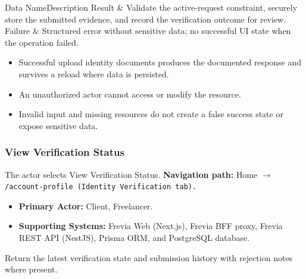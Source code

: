 \begin{specdatatable}{Data Name}{Description}
Result & Validate the active-request constraint, securely store the submitted evidence, and record the verification outcome for review.\\ \hline
Failure & Structured error without sensitive data; no successful UI state when the operation failed.\\ \hline
\end{specdatatable}

\begin{itemize}[leftmargin=1.6em,topsep=3pt,itemsep=2pt,parsep=0pt,label=$\bullet$]
    \item Successful upload identity documents produces the documented response and survives a reload where data is persisted.
    \item An unauthorized actor cannot access or modify the resource.
    \item Invalid input and missing resources do not create a false success state or expose sensitive data.
\end{itemize}

\subsubsection{View Verification Status}

The actor selects View Verification Status.\newline
\textbf{Navigation path:} Home $\rightarrow$ \texttt{/\allowbreak{}account-\allowbreak{}profile (Identity Verification tab).}


\begin{itemize}[leftmargin=1.6em,topsep=3pt,itemsep=2pt,parsep=0pt,label=$\bullet$]
    \item \textbf{Primary Actor:} Client, Freelancer.
    \item \textbf{Supporting Systems:} Frevia Web (Next.js), Frevia BFF proxy, Frevia REST API (NestJS), Prisma ORM, and PostgreSQL database.
\end{itemize}

\noindent Return the latest verification state and submission history with rejection notes where present.

